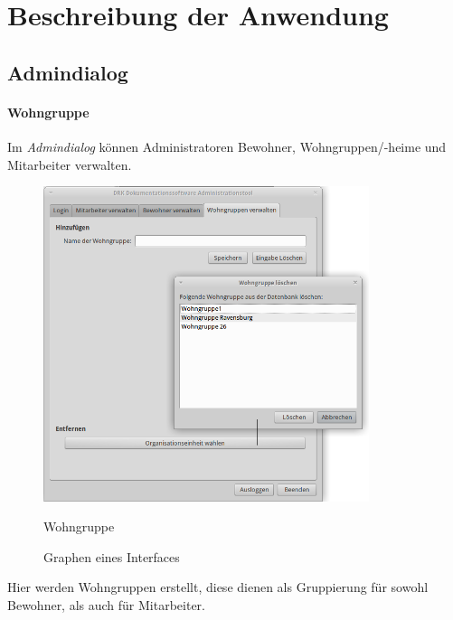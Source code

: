 \section{Beschreibung der Anwendung}
\label{sec:beschreibung}
\subsection{Admindialog}
\paragraph{Wohngruppe}
Im \textit{Admindialog} können Administratoren Bewohner, Wohngruppen/-heime und Mitarbeiter verwalten.
\begin{figure}[h]
	\begin{center}
		\includegraphics[keepaspectratio=true, width=0.85\textwidth]{pics/admin3.png}
		\caption{Wohngruppe}
		\label{Admindialog Wohngruppe}
		\caption{Graphen eines Interfaces}
		\label{Admindialog_Mitarbeiter_erstellen}
	\end{center}
\end{figure}
\FloatBarrier
\noindent
Hier werden Wohngruppen erstellt, diese dienen als Gruppierung für sowohl Bewohner, als auch für Mitarbeiter.
\newpage
\noindent
